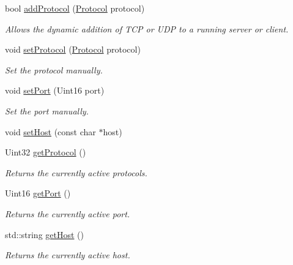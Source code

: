 {\bf }\par
\begin{DoxyCompactItemize}
\item 
bool \hyperlink{classNetManager_a444e45de6f806c4c27d7f9915f898329}{add\-Protocol} (\hyperlink{NetManager_8h_ac5a1bd9a1ae33c413bb774e1ac32501c}{Protocol} protocol)
\begin{DoxyCompactList}\small\item\em Allows the dynamic addition of T\-C\-P or U\-D\-P to a running server or client. \end{DoxyCompactList}\item 
void \hyperlink{classNetManager_af370ee8343ff23121c0c2f180c34dabc}{set\-Protocol} (\hyperlink{NetManager_8h_ac5a1bd9a1ae33c413bb774e1ac32501c}{Protocol} protocol)
\begin{DoxyCompactList}\small\item\em Set the protocol manually. \end{DoxyCompactList}\item 
void \hyperlink{classNetManager_af5db4e28511390202b17f6d711f42d83}{set\-Port} (Uint16 port)
\begin{DoxyCompactList}\small\item\em Set the port manually. \end{DoxyCompactList}\item 
void \hyperlink{classNetManager_a47666370887fee3b2fa27ae7bff1065f}{set\-Host} (const char $\ast$host)
\item 
Uint32 \hyperlink{classNetManager_a3c941b21b356a166f2ebbdd522dc792d}{get\-Protocol} ()
\begin{DoxyCompactList}\small\item\em Returns the currently active protocols. \end{DoxyCompactList}\item 
Uint16 \hyperlink{classNetManager_aa6924b10800963247c025870b1116a62}{get\-Port} ()
\begin{DoxyCompactList}\small\item\em Returns the currently active port. \end{DoxyCompactList}\item 
std\-::string \hyperlink{classNetManager_abe7cce0db370157b36d4e16a903a0581}{get\-Host} ()
\begin{DoxyCompactList}\small\item\em Returns the currently active host. \end{DoxyCompactList}\end{DoxyCompactItemize}

